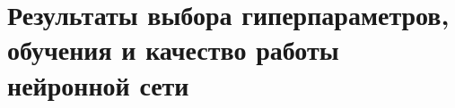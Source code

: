 \section{Результаты выбора гиперпараметров, обучения и качество работы нейронной сети}









\newpage